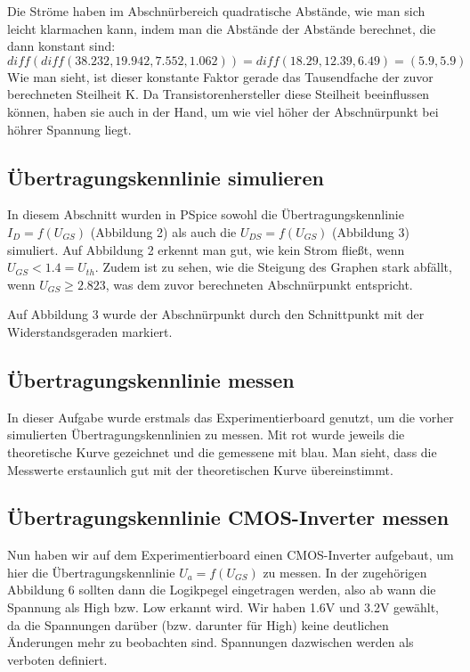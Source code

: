 \documentclass[12pt,a4paper]{scrartcl}
\begin{document}
Die Str\"ome haben im Abschn\"urbereich quadratische Abst\"ande, wie man sich leicht klarmachen kann, indem man die Abst\"ande der Abst\"ande berechnet, die dann konstant sind:
$$diff(diff(38.232, 19.942, 7.552, 1.062)) = diff(18.29, 12.39, 6.49) = (5.9, 5.9)$$
Wie man sieht, ist dieser konstante Faktor gerade das Tausendfache der zuvor berechneten Steilheit K.
Da Transistorenhersteller diese Steilheit beeinflussen k\"onnen, haben sie auch in der Hand, um wie viel h\"oher der Abschn\"urpunkt bei h\"ohrer Spannung liegt.

\subsection{\"Ubertragungskennlinie simulieren}
In diesem Abschnitt wurden in PSpice sowohl die \"Ubertragungskennlinie $I_D=f(U_{GS})$ (Abbildung 2) als auch die $U_{DS}=f(U_{GS})$ (Abbildung 3) simuliert.
Auf Abbildung 2 erkennt man gut, wie kein Strom flie\ss t, wenn $U_{GS} < 1.4=U_{th}$.
Zudem ist zu sehen, wie die Steigung des Graphen stark abf\"allt, wenn $U_{GS} \geq 2.823$, was dem zuvor berechneten Abschn\"urpunkt entspricht.

Auf Abbildung 3 wurde der Abschn\"urpunkt durch den Schnittpunkt mit der Widerstandsgeraden markiert.

\subsection{\"Ubertragungskennlinie messen}
In dieser Aufgabe wurde erstmals das Experimentierboard genutzt, um die vorher simulierten \"Ubertragungskennlinien zu messen.
Mit rot wurde jeweils die theoretische Kurve gezeichnet und die gemessene mit blau.
Man sieht, dass die Messwerte erstaunlich gut mit der theoretischen Kurve \"ubereinstimmt.

\subsection{\"Ubertragungskennlinie CMOS-Inverter messen}
Nun haben wir auf dem Experimentierboard einen CMOS-Inverter aufgebaut, um hier die \"Ubertragungskennlinie $U_a=f(U_{GS})$ zu messen.
In der zugeh\"origen Abbildung 6 sollten dann die Logikpegel eingetragen werden, also ab wann die Spannung als High bzw. Low erkannt wird.
Wir haben 1.6V und 3.2V gew\"ahlt, da die Spannungen dar\"uber (bzw. darunter f\"ur High) keine deutlichen \"Anderungen mehr zu beobachten sind.
Spannungen dazwischen werden als verboten definiert.
\end{document}
